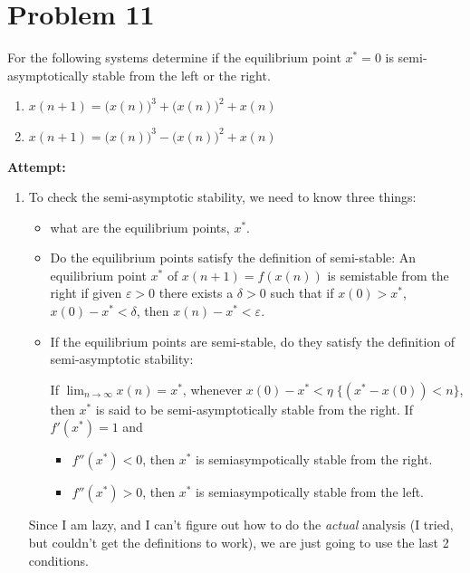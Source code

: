 \documentclass[12pt,letterpaper]{article}
\theoremstyle{definition}
\begin{document}
\section*{Problem 11}
For the following systems determine if the equilibrium point $x^*=0$ is semi-asymptotically stable from the left or the right.
\begin{enumerate}[label=(\roman*)]
    \item $\displaystyle x(n+1) = \big(x(n)\big)^3 + \big(x(n)\big)^2 + x(n)$
    \item $\displaystyle x(n+1) = \big(x(n)\big)^3 - \big(x(n)\big)^2 +x(n)$
\end{enumerate}

\textbf{Attempt:}
\begin{changemargin}{.5cm}{0cm}

\begin{enumerate}[label=(\roman*)]
    \item 
    To check the semi-asymptotic stability, we need to know three things:
    \begin{itemize}
        \item what are the equilibrium points, $x^*$.
        \item Do the equilibrium points satisfy the definition of semi-stable: 
        An equilibrium point $x^*$ of $x(n+1) = f(x(n))$ is semistable from the right if given $\varepsilon>0$ there exists a $\delta>0$ such that if $x(0)>x^*$, $x(0)-x^*<\delta$, then $x(n)-x^*<\varepsilon$. 
        
        \item If the equilibrium points are semi-stable, do they satisfy the definition of semi-asymptotic stability:
        
        If $\displaystyle \lim_{n\rightarrow \infty} x(n) = x^*$, whenever $x(0)-x^*<\eta \; \{(x^* - x(0))<n\}$, then $x^*$ is said to be semi-asymptotically stable from the right. If $f'(x^*)=1$ and 
        \begin{itemize}
            \item $f''(x^*) <0$, then $x^*$ is semiasympotically stable from the right.
            \item $f''(x^*) >0$, then $x^*$ is semiasympotically stable from the left.
        \end{itemize}
    \end{itemize}
    Since I am lazy, and I can't figure out how to do the \textit{actual} analysis (I tried, but couldn't get the definitions to work), we are just going to use the last 2 conditions.


\end{enumerate}
\end{changemargin}
\end{document}
